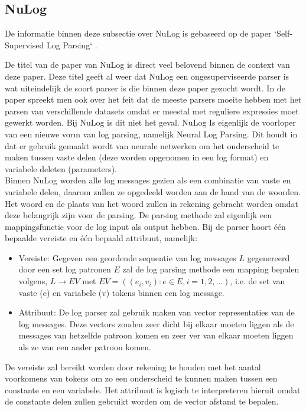 \subsection{NuLog}
De informatie binnen deze subsectie over NuLog is gebaseerd op de paper `Self-Supervised Log Parsing` \autocite{SSLP2020}.

De titel van de paper van NuLog is direct veel belovend binnen de context van deze paper. Deze titel geeft al weer dat NuLog een ongesuperviseerde parser is wat uiteindelijk de soort parser is die binnen deze paper gezocht wordt. In de paper spreekt men ook over het feit dat de meeste parsers moeite hebben met het parsen van verschillende datasets omdat er meestal met reguliere expressies moet gewerkt worden. Bij NuLog is dit niet het geval. NuLog Is eigenlijk de voorloper van een nieuwe vorm van log parsing, namelijk Neural Log Parsing. Dit houdt in dat er gebruik gemaakt wordt van neurale netwerken om het onderscheid te maken tussen vaste delen (deze worden opgenomen in een log format) en variabele deleten (parameters).\\

Binnen NuLog worden alle log messages gezien als een combinatie van vaste en variabele delen, daarom zullen ze opgedeeld worden aan de hand van de woorden. Het woord en de plaats van het woord zullen in rekening gebracht worden omdat deze belangrijk zijn voor de parsing. De parsing methode zal eigenlijk een mappingsfunctie voor de log input als output hebben. Bij de parser hoort één bepaalde vereiste en één bepaald attribuut, namelijk:
\begin{itemize}
    \item Vereiste: Gegeven een geordende sequentie van log messages $L$ gegenereerd door een set log patronen $E$ zal de log parsing methode een mapping bepalen volgens, $L \longrightarrow EV$ met $EV = ((e_{i}, v_{i}): e \in E, i = 1, 2, ...)$, i.e. de set van vaste (e) en variabele (v) tokens binnen een log message. 
    \item Attribuut: De log parser zal gebruik maken van vector representaties van de log messages. Deze vectors zouden zeer dicht bij elkaar moeten liggen als de messages van hetzelfde patroon komen en zeer ver van elkaar moeten liggen als ze van een ander patroon komen. 
\end{itemize}

De vereiste zal bereikt worden door rekening te houden met het aantal voorkomens van tokens om zo een onderscheid te kunnen maken tussen een constante en een variabele. Het attribuut is logisch te interpreteren hieruit omdat de constante delen zullen gebruikt worden om de vector afstand te bepalen.\\

